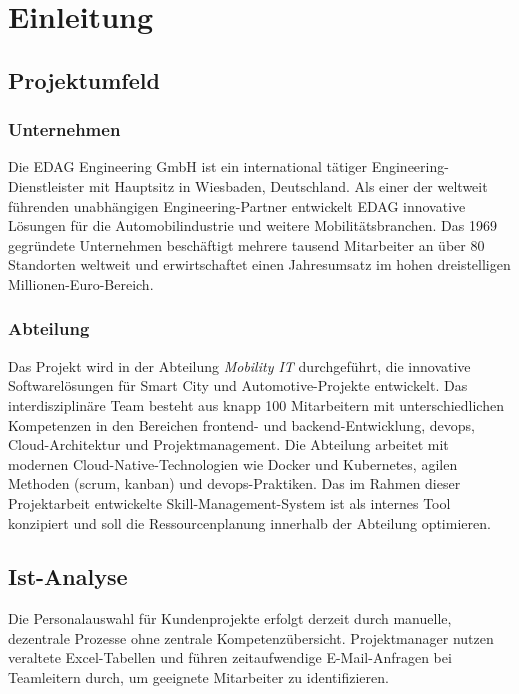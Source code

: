 \chapter{Einleitung}

\section{Projektumfeld}

\subsection{Unternehmen}
Die EDAG Engineering GmbH ist ein international tätiger Engineering-Dienstleister mit Hauptsitz in Wiesbaden, Deutschland. Als einer der weltweit führenden unabhängigen Engineering-Partner entwickelt EDAG innovative Lösungen für die Automobilindustrie und weitere Mobilitätsbranchen\cite{edag_unternehmen}. Das 1969 gegründete Unternehmen beschäftigt mehrere tausend Mitarbeiter an über 80 Standorten weltweit und erwirtschaftet einen Jahresumsatz im hohen dreistelligen Millionen-Euro-Bereich\cite{edag_zahlen}.

\subsection{Abteilung}
Das Projekt wird in der Abteilung \textit{Mobility IT} durchgeführt, die innovative Softwarelösungen für Smart City und Automotive-Projekte entwickelt. Das interdisziplinäre Team besteht aus knapp 100 Mitarbeitern mit unterschiedlichen Kompetenzen in den Bereichen \gls{frontend}- und \gls{backend}-Entwicklung, \gls{devops}, Cloud-Architektur und Projektmanagement. Die Abteilung arbeitet mit modernen Cloud-Native-Technologien wie Docker\cite{docker_docs} und Kubernetes\cite{kubernetes_docs}, agilen Methoden (\gls{scrum}, \gls{kanban}) und \gls{devops}-Praktiken\cite{agile_manifesto,devops_what_is}. Das im Rahmen dieser Projektarbeit entwickelte Skill-Management-System ist als internes Tool konzipiert und soll die Ressourcenplanung innerhalb der Abteilung optimieren.

\section{Ist-Analyse}

Die Personalauswahl für Kundenprojekte erfolgt derzeit durch manuelle, dezentrale Prozesse ohne zentrale Kompetenzübersicht. Projektmanager nutzen veraltete Excel-Tabellen und führen zeitaufwendige E-Mail-Anfragen bei Teamleitern durch, um geeignete Mitarbeiter zu identifizieren.

